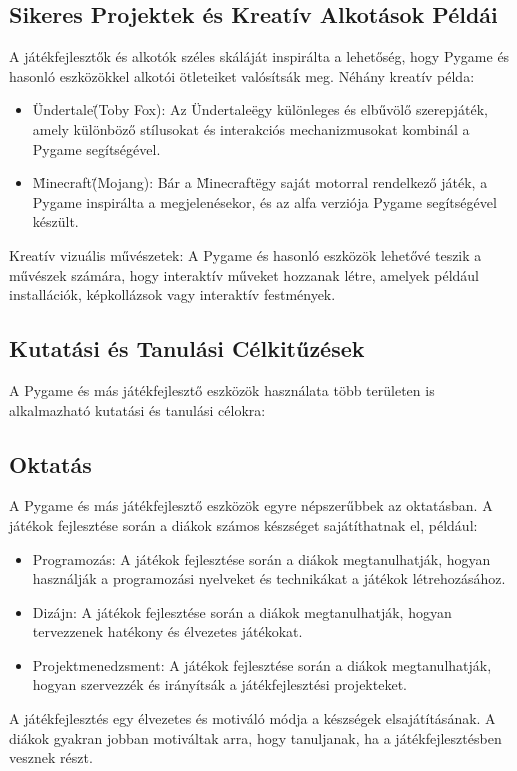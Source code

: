 \subsection{Sikeres Projektek és Kreatív Alkotások Példái}
A játékfejlesztők és alkotók széles skáláját inspirálta a lehetőség, hogy Pygame és hasonló eszközökkel alkotói ötleteiket valósítsák meg. Néhány kreatív példa:
\begin{itemize}
     
    \item\"Undertale\" (Toby Fox): Az \"Undertale\" egy különleges és elbűvölő szerepjáték, amely különböző stílusokat és interakciós mechanizmusokat kombinál a Pygame segítségével.
    
    \item\"Minecraft\" (Mojang): Bár a \"Minecraft\" egy saját motorral rendelkező játék, a Pygame inspirálta a megjelenésekor, és az alfa verziója Pygame segítségével készült.
    
\end{itemize}
Kreatív vizuális művészetek: A Pygame és hasonló eszközök lehetővé teszik a művészek számára, hogy interaktív műveket hozzanak létre, amelyek például installációk, képkollázsok vagy interaktív festmények.

\subsection{Kutatási és Tanulási Célkitűzések}
A Pygame és más játékfejlesztő eszközök használata több területen is alkalmazható kutatási és tanulási célokra:

\subsection{Oktatás} 
A Pygame és más játékfejlesztő eszközök egyre népszerűbbek az oktatásban. A játékok fejlesztése során a diákok számos készséget sajátíthatnak el, például:


\begin{itemize}
    
    \item Programozás: A játékok fejlesztése során a diákok megtanulhatják, hogyan használják a programozási nyelveket és technikákat a játékok létrehozásához.
    \item Dizájn: A játékok fejlesztése során a diákok megtanulhatják, hogyan tervezzenek hatékony és élvezetes játékokat.
    \item Projektmenedzsment: A játékok fejlesztése során a diákok megtanulhatják, hogyan szervezzék és irányítsák a játékfejlesztési projekteket.
\end{itemize}
A játékfejlesztés egy élvezetes és motiváló módja a készségek elsajátításának. A diákok gyakran jobban motiváltak arra, hogy tanuljanak, ha a játékfejlesztésben vesznek részt.


